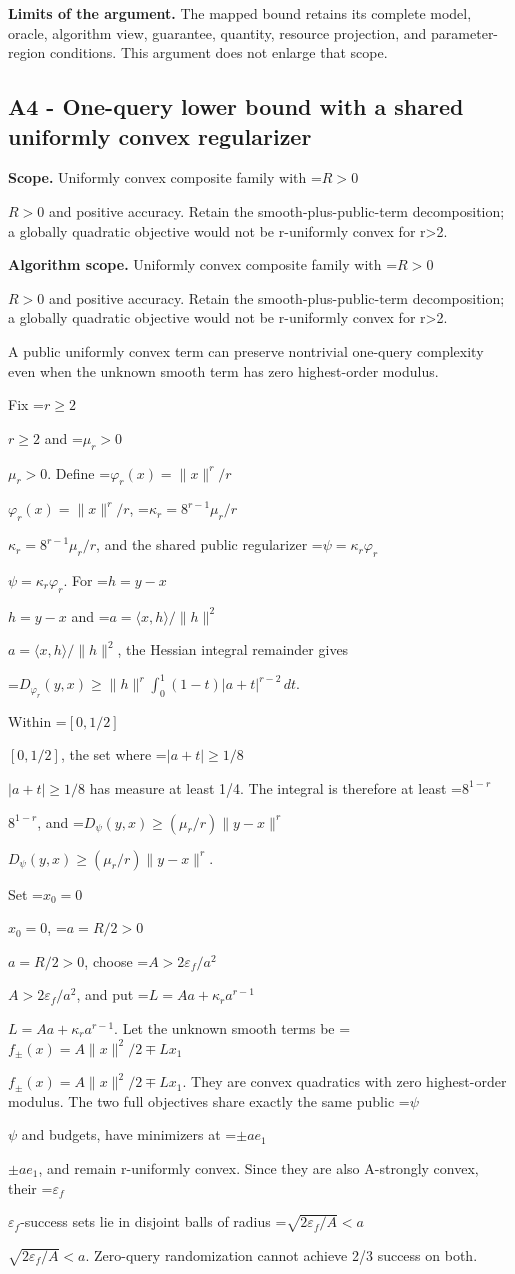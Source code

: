 \documentclass[10pt,a4paper]{article}
\newcommand{\AtlasMath}[1]{\par\begingroup\centering\setbox0=\hbox{$\displaystyle #1$}\ifdim\wd0>1.4\linewidth\typeout{ATLAS WIDE FORMULA: \the\wd0}\fi\ifdim\wd0>\linewidth\resizebox{\linewidth}{!}{\box0}\else\box0\fi\par\endgroup}
\newcommand{\AtlasInlineMath}[1]{\begingroup\setbox0=\hbox{$#1$}\ifdim\wd0>.4\linewidth\endgroup\AtlasMath{#1}\else\endgroup$#1$\fi}
\begin{document}
\textbf{Limits of the argument.} The mapped bound retains its complete model, oracle, algorithm view, guarantee, quantity, resource projection, and parameter-region conditions. This argument does not enlarge that scope.

\subsection{A4 - One-query lower bound with a shared uniformly convex regularizer}
\textbf{Scope.} Uniformly convex composite family with \AtlasInlineMath{R>0} and positive accuracy. Retain the smooth-plus-public-term decomposition; a globally quadratic objective would not be r-uniformly convex for r>2.

\textbf{Algorithm scope.} Uniformly convex composite family with \AtlasInlineMath{R>0} and positive accuracy. Retain the smooth-plus-public-term decomposition; a globally quadratic objective would not be r-uniformly convex for r>2.

A public uniformly convex term can preserve nontrivial one-query complexity even when the unknown smooth term has zero highest-order modulus.

Fix \AtlasInlineMath{r\ge2} and \AtlasInlineMath{\mu_r>0}. Define \AtlasInlineMath{\varphi_r(x)=\|x\|^r/r}, \AtlasInlineMath{\kappa_r=8^{r-1}\mu_r/r}, and the shared public regularizer \AtlasInlineMath{\psi=\kappa_r\varphi_r}. For \AtlasInlineMath{h=y-x} and \AtlasInlineMath{a=\langle x,h\rangle/\|h\|^2}, the Hessian integral remainder gives

\AtlasMath{D_{\varphi_r}(y,x)\ge\|h\|^r\int_0^1(1-t)|a+t|^{r-2}\,dt.}

Within \AtlasInlineMath{[0,1/2]}, the set where \AtlasInlineMath{|a+t|\ge1/8} has measure at least 1/4. The integral is therefore at least \AtlasInlineMath{8^{1-r}}, and \AtlasInlineMath{D_\psi(y,x)\ge(\mu_r/r)\|y-x\|^r}.

Set \AtlasInlineMath{x_0=0}, \AtlasInlineMath{a=R/2>0}, choose \AtlasInlineMath{A>2\varepsilon_f/a^2}, and put \AtlasInlineMath{L=Aa+\kappa_ra^{r-1}}. Let the unknown smooth terms be \AtlasInlineMath{f_\pm(x)=A\|x\|^2/2\mp Lx_1}. They are convex quadratics with zero highest-order modulus. The two full objectives share exactly the same public \AtlasInlineMath{\psi} and budgets, have minimizers at \AtlasInlineMath{\pm a e_1}, and remain r-uniformly convex. Since they are also A-strongly convex, their \AtlasInlineMath{\varepsilon_f}-success sets lie in disjoint balls of radius \AtlasInlineMath{\sqrt{2\varepsilon_f/A}<a}. Zero-query randomization cannot achieve 2/3 success on both.
\end{document}
